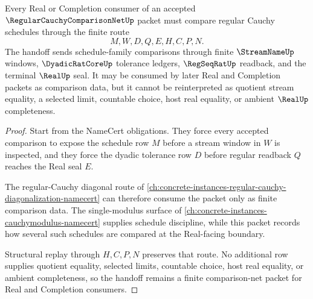 \begin{theorem}
\label{thm:regular-cauchy-comparison-net-real-completion-handoff}
Every Real or Completion consumer of an accepted $\RegularCauchyComparisonNetUp$ packet must compare regular Cauchy schedules through the finite route
$$
M,W,D,Q,E,H,C,P,N .
$$
The handoff sends schedule-family comparisons through finite $\StreamNameUp$ windows, $\DyadicRatCoreUp$ tolerance ledgers, $\RegSeqRatUp$ readback, and the terminal $\RealUp$ seal. It may be consumed by later Real and Completion packets as comparison data, but it cannot be reinterpreted as quotient stream equality, a selected limit, countable choice, host real equality, or ambient $\RealUp$ completeness.
\end{theorem}
\begin{proof}
Start from the NameCert obligations. They force every accepted comparison to expose the schedule row $M$ before a stream window in $W$ is inspected, and they force the dyadic tolerance row $D$ before regular readback $Q$ reaches the Real seal $E$.

The regular-Cauchy diagonal route of \autoref{ch:concrete-instances-regular-cauchy-diagonalization-namecert} can therefore consume the packet only as finite comparison data. The single-modulus surface of \autoref{ch:concrete-instances-cauchymodulus-namecert} supplies schedule discipline, while this packet records how several such schedules are compared at the Real-facing boundary.

Structural replay through $H,C,P,N$ preserves that route. No additional row supplies quotient equality, selected limits, countable choice, host real equality, or ambient completeness, so the handoff remains a finite comparison-net packet for Real and Completion consumers.
\end{proof}

\begin{closurestatus}{\RegularCauchyComparisonNetUp}
  \theoryclosure{\seedClosure}
  \formalstatus{\unformalizedV}
\end{closurestatus}
